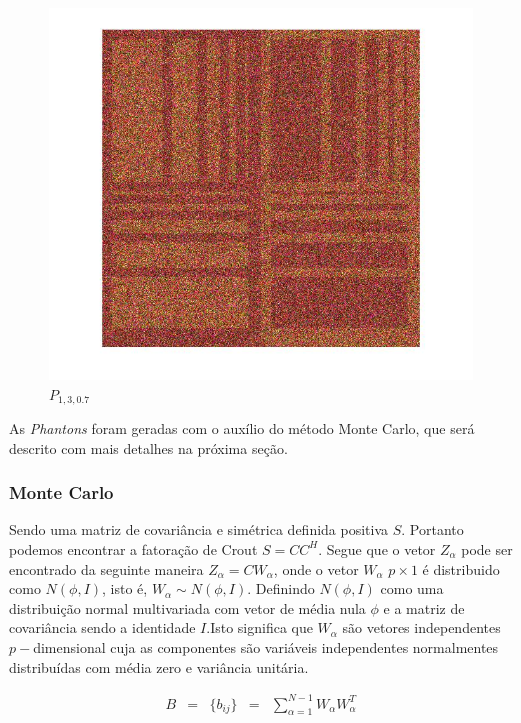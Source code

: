 \documentclass[12pt,a4paper]{article}
\begin{document}
\begin{figure}[!htb]
  \includegraphics[width=\linewidth]{Eq_Phantom_0p700_1_3_1.jpg}
	\caption{ $P_{1,3,0.7}$}\label{fig:awesome_image1}
\endminipage
\end{figure}

As {\it Phantons} foram geradas com o auxílio do método Monte Carlo, 
que será descrito com mais detalhes na próxima seção.

\subsubsection{Monte Carlo \cite{odell1966}}

Sendo uma matriz de covariância e simétrica definida positiva $S$. Portanto podemos encontrar a fatoração de Crout $S=CC^H$. Segue que o vetor $Z_{\alpha}$ pode ser encontrado da seguinte maneira $Z_{\alpha}=CW_{\alpha}$, onde o vetor $W_{\alpha}$ $p\times 1$ é distribuido como $N(\phi,I)$, isto é, $W_{\alpha}\sim N(\phi,I)$. Definindo $N(\phi,I)$ como uma distribuição normal multivariada com vetor de média nula $\phi$ e a matriz de covariância sendo a identidade $I$.Isto significa que $W_{\alpha}$ são vetores independentes $p-$dimensional cuja as componentes são variáveis independentes normalmentes distribuídas com média zero e variância unitária. 

\begin{equation}\label{eqn118}
\begin{array}{ccccc}
	B&=&\{b_{ij}\}&=&\sum_{\alpha=1}^{N-1}W_{\alpha}W_{\alpha}^{T} \\
\end{array}
\end{equation}
\end{document}
